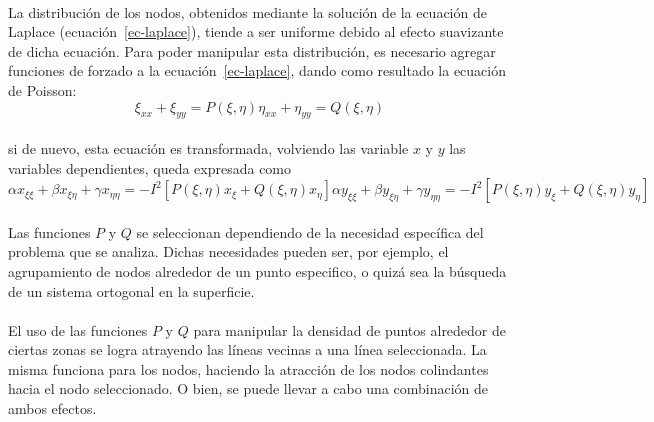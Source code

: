 \documentclass[letterpaper, openright, 12pt]{book}
\begin{document}
    \paragraph*{}
    La distribución de los nodos, obtenidos mediante la solución de la
    ecuación de Laplace (ecuación~\ref{ec-laplace}), tiende a ser uniforme
    debido al efecto suavizante de dicha ecuación. Para poder manipular esta
    distribución, es necesario agregar funciones de forzado a la
    ecuación~\ref{ec-laplace}, dando como resultado la ecuación de Poisson:
    \begin{subequations}
        \begin{equation}
            \xi_{xx} + \xi_{yy} = P(\xi, \eta)
        \end{equation}
        \begin{equation}
            \eta_{xx} + \eta_{yy} = Q(\xi, \eta)
        \end{equation}
        \label{ec-poisson}
    \end{subequations}\\
    si de nuevo, esta ecuación es transformada, volviendo las variable $x$ y
    $y$ las variables dependientes, queda expresada como
    \begin{subequations}
        \begin{equation}
            \alpha x_{\xi \xi} + \beta x_{\xi \eta}
                + \gamma x_{\eta \eta} = -I^2 [P(\xi, \eta) x_{\xi}
                + Q(\xi, \eta) x_{\eta}]
        \end{equation}
        \begin{equation}
            \alpha y_{\xi \xi} + \beta y_{\xi \eta} + \gamma y_{\eta \eta}
                = -I^2 [P(\xi, \eta) y_{\xi} + Q(\xi, \eta) y_{\eta}]
        \end{equation}
        \label{ec-poisson-invertida}
    \end{subequations}

    \paragraph*{}
    Las funciones $P$ y $Q$ se seleccionan dependiendo de la necesidad
    específica del problema que se analiza. Dichas necesidades pueden ser,
    por ejemplo, el agrupamiento de nodos alrededor de un punto especifico,
    o quizá sea la búsqueda de un sistema ortogonal en la superficie.

    \paragraph*{}
    El uso de las funciones $P$ y $Q$ para manipular la densidad de puntos
    alrededor de ciertas zonas se logra atrayendo las líneas vecinas a una
    línea seleccionada. La misma funciona para los nodos, haciendo la
    atracción de los nodos colindantes hacia el nodo seleccionado. O bien,
    se puede llevar a cabo una combinación de ambos efectos.
\end{document}
